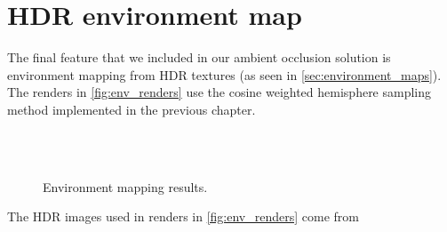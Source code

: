 \section{HDR environment map}
The final feature that we included in our ambient occlusion solution is environment mapping from HDR textures (as seen in \autoref{sec:environment_maps}). The renders in \autoref{fig:env_renders} use the cosine weighted hemisphere sampling method implemented in the previous chapter. 

\begin{figure}[h!]
	\centering
    	\\
    	\\
	\caption{Environment mapping results.}
	\label{fig:env_renders}
\end{figure}

The HDR images used in renders in \autoref{fig:env_renders} come from \cite{website:PaulDebevec}